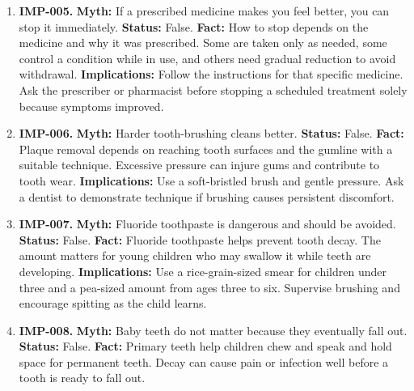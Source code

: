 \documentclass[11pt,oneside]{book}
\begin{document}
\begin{enumerate}[leftmargin=0pt,labelwidth=0pt,labelsep=0pt,itemindent=0pt]
\textbf{Implications:} Check all pain and cold remedies for the same ingredient. If an overdose may have occurred, contact a poison service or emergency department immediately, even if the person feels well.
\item[] \textbf{IMP-005.} \textbf{Myth:} If a prescribed medicine makes you feel better, you can stop it immediately.\newline
\textbf{Status:} False.\newline
\textbf{Fact:} How to stop depends on the medicine and why it was prescribed. Some are taken only as needed, some control a condition while in use, and others need gradual reduction to avoid withdrawal. \cite{ref397,ref272}\newline
\textbf{Implications:} Follow the instructions for that specific medicine. Ask the prescriber or pharmacist before stopping a scheduled treatment solely because symptoms improved.
\item[] \textbf{IMP-006.} \textbf{Myth:} Harder tooth-brushing cleans better.\newline
\textbf{Status:} False.\newline
\textbf{Fact:} Plaque removal depends on reaching tooth surfaces and the gumline with a suitable technique. Excessive pressure can injure gums and contribute to tooth wear. \cite{ref44}\newline
\textbf{Implications:} Use a soft-bristled brush and gentle pressure. Ask a dentist to demonstrate technique if brushing causes persistent discomfort.
\item[] \textbf{IMP-007.} \textbf{Myth:} Fluoride toothpaste is dangerous and should be avoided.\newline
\textbf{Status:} False.\newline
\textbf{Fact:} Fluoride toothpaste helps prevent tooth decay. The amount matters for young children who may swallow it while teeth are developing. \cite{ref45}\newline
\textbf{Implications:} Use a rice-grain-sized smear for children under three and a pea-sized amount from ages three to six. Supervise brushing and encourage spitting as the child learns.
\item[] \textbf{IMP-008.} \textbf{Myth:} Baby teeth do not matter because they eventually fall out.\newline
\textbf{Status:} False.\newline
\textbf{Fact:} Primary teeth help children chew and speak and hold space for permanent teeth. Decay can cause pain or infection well before a tooth is ready to fall out. \cite{ref398}\newline

\end{enumerate}
\end{document}
